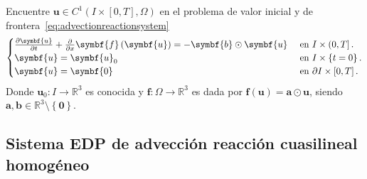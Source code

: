 Encuentre
\begin{math}
	\symbf{u}\in
	C^{1}\left(I\times\left[0,T\right],\Omega\right)
\end{math}
en el problema de valor inicial y de frontera~\eqref{eq:advectionreactionsystem}
\begin{equation}\label{eq:advectionreactionsystem}
	\begin{cases}
		\diffp{\symbf{u}}{t}+\diffp{}{x}\symbf{f}\left(\symbf{u}\right)               =
		-\symbf{b}\odot\symbf{u} &
		\text{ en }I\times\left(0,T\right].   \\
		\symbf{u}                                                                     =
		\symbf{u}_{0}            &
		\text{ en }I\times\left\{t=0\right\}. \\
		\symbf{u}                                                                     =
		\symbf{0}                &
		\text{ en }\partial I\times\left[0,T\right].
	\end{cases}
\end{equation}
Donde
\begin{math}
	\symbf{u}_{0}\colon I\to
	\mathbb{R}^{3}
\end{math}
es conocida y
\begin{math}
	\symbf{f}\colon\Omega\to
	\mathbb{R}^{3}
\end{math}
es dada por
\begin{math}
	\symbf{f}\left(\symbf{u}\right)=
	\symbf{a}\odot\symbf{u}
\end{math},
siendo $\symbf{a},\symbf{b}\in\mathbb{R}^{3}\setminus\left\{\symbf{0}\right\}$.

\subsection*{Sistema EDP de advección reacción cuasilineal homogéneo}

